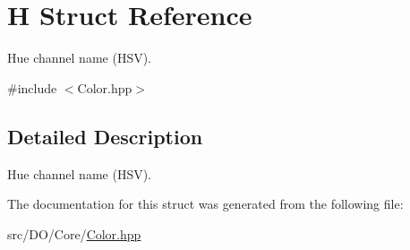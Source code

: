 \hypertarget{struct_d_o_1_1_h}{\section{H Struct Reference}
\label{struct_d_o_1_1_h}
}


Hue channel name (H\-S\-V).  




{\ttfamily \#include $<$Color.\-hpp$>$}



\subsection{Detailed Description}
Hue channel name (H\-S\-V). 

The documentation for this struct was generated from the following file\-:\begin{DoxyCompactItemize}
\item 
src/\-D\-O/\-Core/\hyperlink{_color_8hpp}{Color.\-hpp}\end{DoxyCompactItemize}
